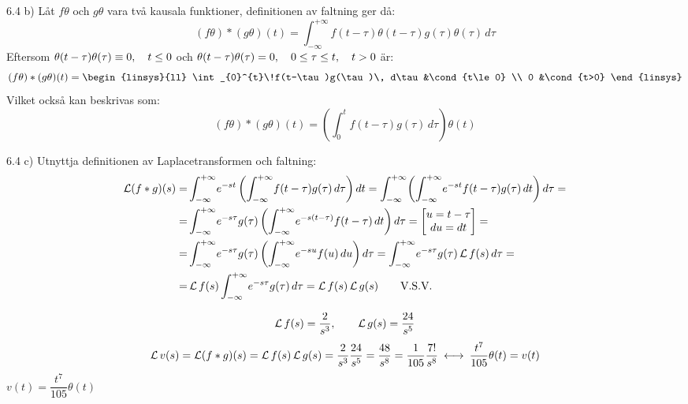 \begin{task}{6.4 b)}
	Låt $f\theta$ och $g\theta$ vara två kausala funktioner, definitionen av faltning ger då:
	\[(f\theta)*(g\theta)(t)=
	\int_{-\infty}^{+\infty}\!f(t-\tau)\theta(t-\tau)g(\tau)\theta(\tau)\, d\tau\]
	Eftersom $\theta(t-\tau)\theta(\tau)\equiv0, \quad t\le 0$ och $\theta(t-\tau)\theta(\tau)=0, \quad 0\le\tau\le t, \quad t > 0$ är:
	\[(f\theta)*(g\theta)(t)=\begin{linsys}{ll}
	\int_{0}^{t}\!f(t-\tau)g(\tau)\, d\tau&\cond{t\le0} \\
	0                                     &\cond{t>0}
	\end{linsys}\]
	Vilket också kan beskrivas som:
	\[(f\theta)*(g\theta)(t)=
	\left(\int_{0}^{t}\!f(t-\tau)g(\tau)\, d\tau\right)\theta(t)\]
\end{task}

\begin{task}{6.4 c)}
	Utnyttja definitionen av Laplacetransformen och faltning:
	\begin{align*}
	\laplace(f*g)(s)=
	&\int_{-\infty}^{+\infty}\!e^{-st}\left(\int_{-\infty}^{+\infty}\!f(t-\tau)g(\tau)\,d\tau\right)dt=
	\int_{-\infty}^{+\infty}\!\left(\int_{-\infty}^{+\infty}\!e^{-st}f(t-\tau)g(\tau)\,dt\right)d\tau= \\ =
	&\int_{-\infty}^{+\infty}\!e^{-s\tau}g(\tau)\left(\int_{-\infty}^{+\infty}\!e^{-s(t-\tau)}f(t-\tau)\,dt\right)d\tau=
	\begin{bmatrix}
	u=t-\tau \\
	du=dt
	\end{bmatrix}= \\ =
	&\int_{-\infty}^{+\infty}\!e^{-s\tau}g(\tau)\left(\int_{-\infty}^{+\infty}\!e^{-su}f(u)\,du\right)d\tau=
	\int_{-\infty}^{+\infty}\!e^{-s\tau}g(\tau)\laplace f(s)\, d\tau= \\ =
	&\laplace f(s)\int_{-\infty}^{+\infty}\!e^{-s\tau}g(\tau)\, d\tau=
	\laplace f(s)\*\laplace g(s)\mproof
	\end{align*}
\end{task}

\begin{task}{6.5}
	\[\operatorname{\mathcal{L}} f(s)=\frac{2}{s^3},\qquad
	\operatorname{\mathcal{L}} g(s)=\frac{24}{s^5}\]
	\begin{align*}
	\laplace v(s)=
	\laplace(f*g)(s)=
	\laplace f(s)\*\laplace g(s)=
	\frac{2}{s^3}\*\frac{24}{s^5}=
	\frac{48}{s^8}=\frac{1}{105}\*\frac{7!}{s^8}\llra
	\frac{t^{7}}{105}\theta(t)=
	v(t)
	\end{align*}
	\ans $v(t)=\dfrac{t^{7}}{105}\theta(t)$
\end{task}
